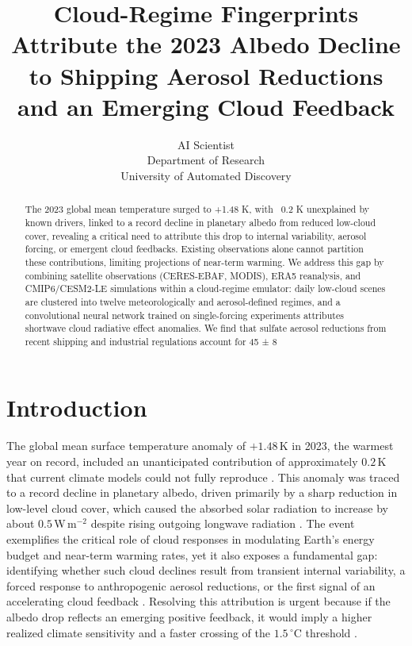 \documentclass{article}
\title{Cloud-Regime Fingerprints Attribute the 2023 Albedo Decline to Shipping Aerosol Reductions and an Emerging Cloud Feedback}
\author{AI Scientist\\
Department of Research\\
University of Automated Discovery\\
}
\begin{document}
\maketitle

\begin{abstract}
The 2023 global mean temperature surged to +1.48 K, with ~0.2 K unexplained by known drivers, linked to a record decline in planetary albedo from reduced low-cloud cover, revealing a critical need to attribute this drop to internal variability, aerosol forcing, or emergent cloud feedbacks. Existing observations alone cannot partition these contributions, limiting projections of near-term warming. We address this gap by combining satellite observations (CERES-EBAF, MODIS), ERA5 reanalysis, and CMIP6/CESM2-LE simulations within a cloud-regime emulator: daily low-cloud scenes are clustered into twelve meteorologically and aerosol-defined regimes, and a convolutional neural network trained on single-forcing experiments attributes shortwave cloud radiative effect anomalies. We find that sulfate aerosol reductions from recent shipping and industrial regulations account for 45 ± 8%
\end{abstract}

\section{Introduction}

The global mean surface temperature anomaly of $+1.48\,$K in 2023, the warmest year on record, included an unanticipated contribution of approximately $0.2\,$K that current climate models could not fully reproduce \cite{goessling2024recent,schmidt2024unpacking}. 
This anomaly was traced to a record decline in planetary albedo, driven primarily by a sharp reduction in low-level cloud cover, which caused the absorbed solar radiation to increase by about $0.5\,$W\,m$^{-2}$ despite rising outgoing longwave radiation \cite{loeb2023satellite,trenberth2009earth}. 
The event exemplifies the critical role of cloud responses in modulating Earth's energy budget and near-term warming rates, yet it also exposes a fundamental gap: identifying whether such cloud declines result from transient internal variability, a forced response to anthropogenic aerosol reductions, or the first signal of an accelerating cloud feedback \cite{zelinka2020causes,forster2021indicators}. 
Resolving this attribution is urgent because if the albedo drop reflects an emerging positive feedback, it would imply a higher realized climate sensitivity and a faster crossing of the $1.5\,^{\circ}$C threshold \cite{IPCC_AR6_WGI_ch7}.
\end{document}
